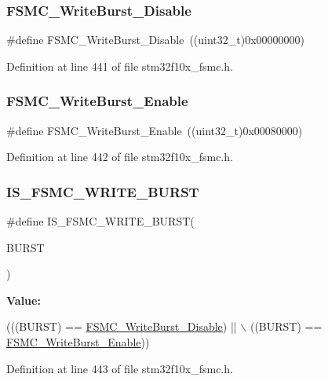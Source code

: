 \subsubsection{\texorpdfstring{F\+S\+M\+C\+\_\+\+Write\+Burst\+\_\+\+Disable}{FSMC\_WriteBurst\_Disable}}
{\footnotesize\ttfamily \#define F\+S\+M\+C\+\_\+\+Write\+Burst\+\_\+\+Disable~((uint32\+\_\+t)0x00000000)}



Definition at line 441 of file stm32f10x\+\_\+fsmc.\+h.

\mbox{\label{group___f_s_m_c___write___burst_ga1b2b66a0eb42778c2cc9a05003cf7655}} 
\subsubsection{\texorpdfstring{F\+S\+M\+C\+\_\+\+Write\+Burst\+\_\+\+Enable}{FSMC\_WriteBurst\_Enable}}
{\footnotesize\ttfamily \#define F\+S\+M\+C\+\_\+\+Write\+Burst\+\_\+\+Enable~((uint32\+\_\+t)0x00080000)}



Definition at line 442 of file stm32f10x\+\_\+fsmc.\+h.

\mbox{\label{group___f_s_m_c___write___burst_gab7b03a33fab765827832abbf07d01a10}} 
\subsubsection{\texorpdfstring{I\+S\+\_\+\+F\+S\+M\+C\+\_\+\+W\+R\+I\+T\+E\+\_\+\+B\+U\+R\+ST}{IS\_FSMC\_WRITE\_BURST}}
{\footnotesize\ttfamily \#define I\+S\+\_\+\+F\+S\+M\+C\+\_\+\+W\+R\+I\+T\+E\+\_\+\+B\+U\+R\+ST(\begin{DoxyParamCaption}\item[{}]{B\+U\+R\+ST }\end{DoxyParamCaption})}

{\bfseries Value\+:}
\begin{DoxyCode}
(((BURST) == \hyperlink{group___f_s_m_c___write___burst_ga65a49ecd05b3a128e8908c6a625adae7}{FSMC\_WriteBurst\_Disable}) || \(\backslash\)
                                    ((BURST) == \hyperlink{group___f_s_m_c___write___burst_ga1b2b66a0eb42778c2cc9a05003cf7655}{FSMC\_WriteBurst\_Enable}))
\end{DoxyCode}


Definition at line 443 of file stm32f10x\+\_\+fsmc.\+h.

